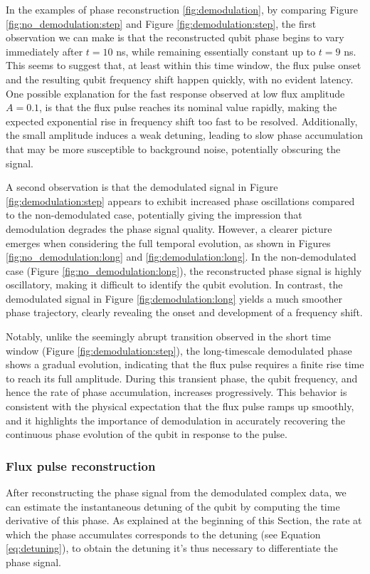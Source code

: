 In the examples of phase reconstruction \ref{fig:demodulation}, by comparing Figure \ref{fig:no_demodulation:step} and Figure \ref{fig:demodulation:step}, the first observation we can make is that the reconstructed qubit phase begins to vary immediately after $t=10$ ns, while remaining essentially constant up to $t=9$ ns. 
This seems to suggest that, at least within this time window, the flux pulse onset and the resulting qubit frequency shift happen quickly, with no evident latency.
One possible explanation for the fast response observed at low flux amplitude $A = 0.1$, is that the flux pulse reaches its nominal value rapidly, making the expected exponential rise in frequency shift too fast to be resolved. 
Additionally, the small amplitude induces a weak detuning, leading to slow phase accumulation that may be more susceptible to background noise, potentially obscuring the signal.

A second observation is that the demodulated signal in Figure \ref{fig:demodulation:step} appears to exhibit increased phase oscillations compared to the non-demodulated case, potentially giving the impression that demodulation degrades the phase signal quality. 
However, a clearer picture emerges when considering the full temporal evolution, as shown in Figures \ref{fig:no_demodulation:long} and \ref{fig:demodulation:long}. 
In the non-demodulated case (Figure \ref{fig:no_demodulation:long}), the reconstructed phase signal is highly oscillatory, making it difficult to identify the qubit evolution. 
In contrast, the demodulated signal in Figure \ref{fig:demodulation:long} yields a much smoother phase trajectory, clearly revealing the onset and development of a frequency shift.

Notably, unlike the seemingly abrupt transition observed in the short time window (Figure \ref{fig:demodulation:step}), the long-timescale demodulated phase shows a gradual evolution, indicating that the flux pulse requires a finite rise time to reach its full amplitude. 
During this transient phase, the qubit frequency, and hence the rate of phase accumulation, increases progressively. 
This behavior is consistent with the physical expectation that the flux pulse ramps up smoothly, and it highlights the importance of demodulation in accurately recovering the continuous phase evolution of the qubit in response to the pulse.

\subsubsection{Flux pulse reconstruction}\label{subsec:WL}
After reconstructing the phase signal from the demodulated complex data, we can estimate the instantaneous detuning of the qubit by computing the time derivative of this phase. 
As explained at the beginning of this Section, the rate at which the phase accumulates corresponds to the detuning (see Equation \ref{eq:detuning}), to obtain the detuning it's thus necessary to differentiate the phase signal. 

